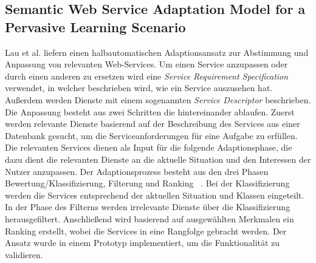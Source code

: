 \documentclass[conference,compsoc]{IEEEtran}
\begin{document}
\subsection{Semantic Web Service Adaptation Model for a Pervasive Learning Scenario}
Lau et al.\cite{lau2008semantic} liefern einen halbautomatischen Adaptionsansatz zur Abstimmung und Anpassung von relevanten Web-Services. Um einen Service anzupassen oder durch einen anderen zu ersetzen wird eine \textit{Service Requirement Specification} verwendet, in welcher beschrieben wird, wie ein Service auszusehen hat. Außerdem werden Dienste mit einem sogenannten \textit{Service Descriptor} beschrieben. Die Anpassung besteht aus zwei Schritten die hintereinander ablaufen. Zuerst werden relevante Dienste basierend auf der Beschreibung des Services aus einer Datenbank gesucht, um die Serviceanforderungen für eine Aufgabe zu erfüllen. Die relevanten Services dienen als Input für die folgende Adaptionsphase, die dazu dient die relevanten Dienste an die aktuelle Situation und den Interessen der Nutzer anzupassen. Der Adaptionsprozess besteht aus den drei Phasen Bewertung/Klassifizierung, Filterung und Ranking ~\cite{lau2008semantic}. Bei der Klassifizierung werden die Services entsprechend der aktuellen Situation und Klassen eingeteilt. In der Phase des Filterns werden irrelevante Dienste über die Klassifizierung herausgefiltert. Anschließend wird basierend auf ausgewählten Merkmalen ein Ranking erstellt, wobei die Services in eine Rangfolge gebracht werden.
Der Ansatz wurde in einem Prototyp implementiert, um die Funktionalität zu validieren.
\end{document}
